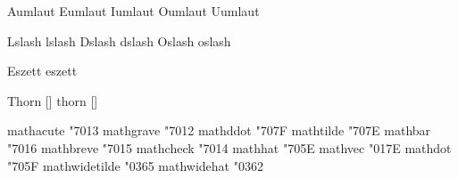  Aumlaut {\smashaccent\Adiaeresis}
 Eumlaut {\smashaccent\Ediaeresis}
 Iumlaut {\smashaccent\Idiaeresis}
 Oumlaut {\smashaccent\Odiaeresis}
 Uumlaut {\smashaccent\Udiaeresis}

 Lslash  {\Lstroke}
 lslash  {\lstroke}
 Dslash  {\Lstroke}
 dslash  {\lstroke}
 Oslash  {\Lstroke}
 oslash  {\lstroke}

 Eszett  {\Ssharp}
 eszett  {\ssharp}

 Thorn {[]}
 thorn {[]}

\stopencoding


\startencoding[default]

 mathacute      "7013 
 mathgrave      "7012 
 mathddot       "707F 
 mathtilde      "707E 
 mathbar        "7016 
 mathbreve      "7015 
 mathcheck      "7014 
 mathhat        "705E 
 mathvec        "017E 
 mathdot        "705F 
 mathwidetilde  "0365 
 mathwidehat    "0362 

\stopencoding

\endinput
